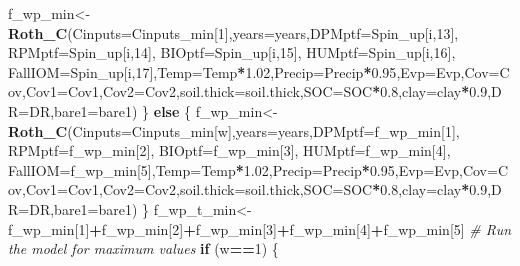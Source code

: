 \documentclass[
  10pt,
  b5paper,
]{book}
\newenvironment{Shaded}{\begin{snugshade}}{\end{snugshade}}
\newcommand{\CommentTok}[1]{\textcolor[rgb]{0.56,0.35,0.01}{\textit{#1}}}
\newcommand{\ControlFlowTok}[1]{\textcolor[rgb]{0.13,0.29,0.53}{\textbf{#1}}}
\newcommand{\DataTypeTok}[1]{\textcolor[rgb]{0.13,0.29,0.53}{#1}}
\newcommand{\DecValTok}[1]{\textcolor[rgb]{0.00,0.00,0.81}{#1}}
\newcommand{\FloatTok}[1]{\textcolor[rgb]{0.00,0.00,0.81}{#1}}
\newcommand{\KeywordTok}[1]{\textcolor[rgb]{0.13,0.29,0.53}{\textbf{#1}}}
\newcommand{\NormalTok}[1]{#1}
\newcommand{\OperatorTok}[1]{\textcolor[rgb]{0.81,0.36,0.00}{\textbf{#1}}}
\begin{document}
\begin{Shaded}
\begin{Highlighting}[]
\NormalTok{f_wp_min<-}\KeywordTok{Roth_C}\NormalTok{(}\DataTypeTok{Cinputs=}\NormalTok{Cinputs_min[}\DecValTok{1}\NormalTok{],}\DataTypeTok{years=}\NormalTok{years,}\DataTypeTok{DPMptf=}\NormalTok{Spin_up[i,}\DecValTok{13}\NormalTok{], }\DataTypeTok{RPMptf=}\NormalTok{Spin_up[i,}\DecValTok{14}\NormalTok{], }\DataTypeTok{BIOptf=}\NormalTok{Spin_up[i,}\DecValTok{15}\NormalTok{], }\DataTypeTok{HUMptf=}\NormalTok{Spin_up[i,}\DecValTok{16}\NormalTok{], }\DataTypeTok{FallIOM=}\NormalTok{Spin_up[i,}\DecValTok{17}\NormalTok{],}\DataTypeTok{Temp=}\NormalTok{Temp}\OperatorTok{*}\FloatTok{1.02}\NormalTok{,}\DataTypeTok{Precip=}\NormalTok{Precip}\OperatorTok{*}\FloatTok{0.95}\NormalTok{,}\DataTypeTok{Evp=}\NormalTok{Evp,}\DataTypeTok{Cov=}\NormalTok{Cov,}\DataTypeTok{Cov1=}\NormalTok{Cov1,}\DataTypeTok{Cov2=}\NormalTok{Cov2,}\DataTypeTok{soil.thick=}\NormalTok{soil.thick,}\DataTypeTok{SOC=}\NormalTok{SOC}\OperatorTok{*}\FloatTok{0.8}\NormalTok{,}\DataTypeTok{clay=}\NormalTok{clay}\OperatorTok{*}\FloatTok{0.9}\NormalTok{,}\DataTypeTok{DR=}\NormalTok{DR,}\DataTypeTok{bare1=}\NormalTok{bare1)}
\NormalTok{\} }\ControlFlowTok{else}\NormalTok{ \{}
\NormalTok{f_wp_min<-}\KeywordTok{Roth_C}\NormalTok{(}\DataTypeTok{Cinputs=}\NormalTok{Cinputs_min[w],}\DataTypeTok{years=}\NormalTok{years,}\DataTypeTok{DPMptf=}\NormalTok{f_wp_min[}\DecValTok{1}\NormalTok{], }\DataTypeTok{RPMptf=}\NormalTok{f_wp_min[}\DecValTok{2}\NormalTok{], }\DataTypeTok{BIOptf=}\NormalTok{f_wp_min[}\DecValTok{3}\NormalTok{], }\DataTypeTok{HUMptf=}\NormalTok{f_wp_min[}\DecValTok{4}\NormalTok{], }\DataTypeTok{FallIOM=}\NormalTok{f_wp_min[}\DecValTok{5}\NormalTok{],}\DataTypeTok{Temp=}\NormalTok{Temp}\OperatorTok{*}\FloatTok{1.02}\NormalTok{,}\DataTypeTok{Precip=}\NormalTok{Precip}\OperatorTok{*}\FloatTok{0.95}\NormalTok{,}\DataTypeTok{Evp=}\NormalTok{Evp,}\DataTypeTok{Cov=}\NormalTok{Cov,}\DataTypeTok{Cov1=}\NormalTok{Cov1,}\DataTypeTok{Cov2=}\NormalTok{Cov2,}\DataTypeTok{soil.thick=}\NormalTok{soil.thick,}\DataTypeTok{SOC=}\NormalTok{SOC}\OperatorTok{*}\FloatTok{0.8}\NormalTok{,}\DataTypeTok{clay=}\NormalTok{clay}\OperatorTok{*}\FloatTok{0.9}\NormalTok{,}\DataTypeTok{DR=}\NormalTok{DR,}\DataTypeTok{bare1=}\NormalTok{bare1)}
\NormalTok{\}}
\NormalTok{f_wp_t_min<-f_wp_min[}\DecValTok{1}\NormalTok{]}\OperatorTok{+}\NormalTok{f_wp_min[}\DecValTok{2}\NormalTok{]}\OperatorTok{+}\NormalTok{f_wp_min[}\DecValTok{3}\NormalTok{]}\OperatorTok{+}\NormalTok{f_wp_min[}\DecValTok{4}\NormalTok{]}\OperatorTok{+}\NormalTok{f_wp_min[}\DecValTok{5}\NormalTok{]}
\CommentTok{# Run the model for maximum values}
\ControlFlowTok{if}\NormalTok{ (w}\OperatorTok{==}\DecValTok{1}\NormalTok{) \{}

\end{Highlighting}
\end{Shaded}
\end{document}
